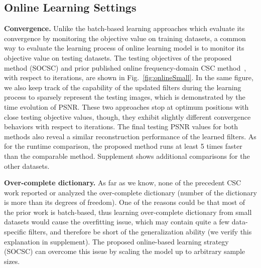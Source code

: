 \subsection{Online Learning Settings}

{\bfseries Convergence.} Unlike the batch-based learning approaches which evaluate its convergence by monitoring the objective value on training datasets, a common way to evaluate the learning process of online learning model is to monitor its objective value on testing datasets. The testing objectives of the proposed method (SOCSC) and prior published online frequency-domain CSC method~\cite{liu-2018-first}, with respect to iterations, are shown in Fig.\ \ref{fig:onlineSmall}. In the same figure, we also keep track of the capability of the updated filters during the learning process to sparsely represent the testing images, which is demonstrated by the time evolution of PSNR. These two approaches stop at optimum positions with close testing objective values, though, they exhibit slightly different convergence behaviors with respect to iterations. The final testing PSNR values for both methods also reveal a similar reconstruction performance of the learned filters. As for the runtime comparison, the proposed method runs at least 5 times faster than the comparable method. Supplement shows additional comparisons for the other datasets.


{\bfseries Over-complete dictionary.} As far as we know, none of the precedent CSC work reported or analyzed the over-complete dictionary (number of the dictionary is more than its degrees of freedom). One of the reasons could be that most of the prior work is batch-based, thus learning over-complete dictionary from small datasets would cause the overfitting issue, which may contain quite a few data-specific filters, and therefore be short of the generalization ability (we verify this explanation in supplement). The proposed online-based learning strategy (SOCSC) can overcome this issue by scaling the model up to arbitrary sample sizes.

